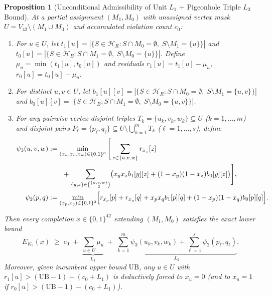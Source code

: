 \documentclass[11pt,a4paper]{article}
\theoremstyle{plain}
\newtheorem{proposition}[theorem]{Proposition}
\theoremstyle{definition}
\begin{document}
\begin{proposition}[Unconditional Admissibility of Unit $L_1$ + Pigeonhole Triple $L_3$ Bound]\label{prop:pigeonhole-lb}
At a partial assignment $(M_1, M_0)$ with unassigned vertex mask $U = V_{42} \setminus (M_1 \cup M_0)$ and accumulated violation count $c_0$:
\begin{enumerate}
  \item For $u \in U$, let $t_1[u] = |\{S \in \mathcal{H}_R : S \cap M_0 = \emptyset,\; S \setminus M_1 = \{u\}\}|$ and $t_0[u] = |\{S \in \mathcal{H}_B : S \cap M_1 = \emptyset,\; S \setminus M_0 = \{u\}\}|$. Define $\mu_u = \min(t_1[u], t_0[u])$ and residuals $r_1[u] = t_1[u] - \mu_u$, $r_0[u] = t_0[u] - \mu_u$.
  \item For distinct $u, v \in U$, let $b_1[u][v] = |\{S \in \mathcal{H}_R : S \cap M_0 = \emptyset,\; S \setminus M_1 = \{u,v\}\}|$ and $b_0[u][v] = |\{S \in \mathcal{H}_B : S \cap M_1 = \emptyset,\; S \setminus M_0 = \{u,v\}\}|$.
  \item For any pairwise vertex-disjoint triples $T_k = \{u_k, v_k, w_k\} \subseteq U$ ($k=1,\dots,m$) and disjoint pairs $P_\ell = \{p_\ell, q_\ell\} \subseteq U \setminus \bigcup_{k=1}^m T_k$ ($\ell=1,\dots,s$), define
  \begin{align*}
    \psi_3(u,v,w) &:= \min_{(x_u,x_v,x_w) \in \{0,1\}^3} \Bigg[ \sum_{z \in \{u,v,w\}} r_{x_z}[z] \\
                  &\qquad + \sum_{\{y,z\} \in \binom{\{u,v,w\}}{2}} \bigl(x_y x_z b_1[y][z] + (1-x_y)(1-x_z) b_0[y][z]\bigr) \Bigg],\\
    \psi_2(p,q) &:= \min_{(x_p,x_q) \in \{0,1\}^2} \Bigl[ r_{x_p}[p] + r_{x_q}[q] + x_p x_q b_1[p][q] + (1-x_p)(1-x_q) b_0[p][q] \Bigr].
  \end{align*}
\end{enumerate}
Then every completion $x \in \{0,1\}^{42}$ extending $(M_1, M_0)$ satisfies the exact lower bound
\begin{equation}\label{eq:lb13}
  E_{K_5}(x) \;\ge\; c_0 \;+\; \underbrace{\sum_{u \in U} \mu_u}_{L_1} \;+\; \underbrace{\sum_{k=1}^m \psi_3(u_k, v_k, w_k) + \sum_{\ell=1}^s \psi_2(p_\ell, q_\ell)}_{L_3}.
\end{equation}
Moreover, given incumbent upper bound $\mathrm{UB}$, any $u \in U$ with $r_1[u] > (\mathrm{UB}-1) - (c_0 + L_1)$ is deductively forced to $x_u = 0$ (and to $x_u = 1$ if $r_0[u] > (\mathrm{UB}-1) - (c_0 + L_1)$).
\end{proposition}
\end{document}
